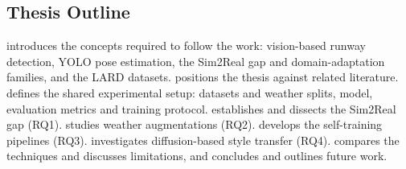 \subsection{Thesis Outline}
\label{subsec:outline}
 introduces the concepts required to follow the work: vision-based
runway detection, YOLO pose estimation, the Sim2Real gap and domain-adaptation
families, and the LARD datasets.  positions the thesis
against related literature.  defines the shared experimental
setup: datasets and weather splits, model, evaluation metrics and training
protocol.  establishes and dissects the Sim2Real gap (RQ1).
 studies weather augmentations (RQ2). 
develops the self-training pipelines (RQ3).  investigates
diffusion-based style transfer (RQ4).  compares the techniques
and discusses limitations, and  concludes and outlines future
work.
